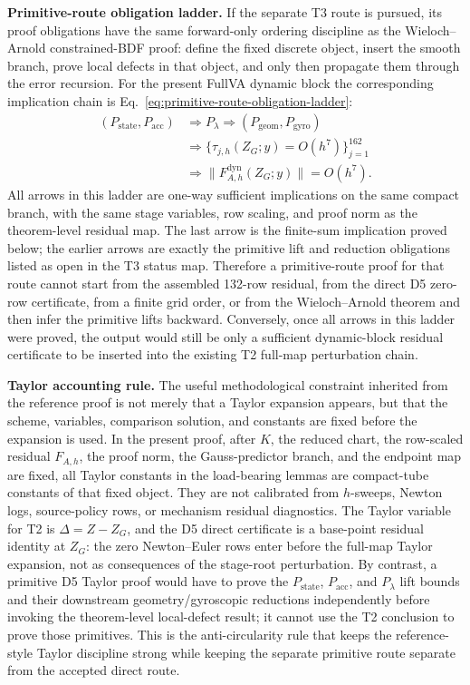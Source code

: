 \documentclass[preprint,12pt]{elsarticle}
\begin{document}
\noindent\textbf{Primitive-route obligation ladder.}
If the separate T3 route is pursued, its proof obligations have the same
forward-only ordering discipline as the Wieloch--Arnold constrained-BDF proof: define
the fixed discrete object, insert the smooth branch, prove local defects in
that object, and only then propagate them through the error recursion.  For the
present FullVA dynamic block the corresponding implication chain is
Eq.~\eqref{eq:primitive-route-obligation-ladder}:
\begin{equation}
\label{eq:primitive-route-obligation-ladder}
\begin{aligned}
  (P_{\mathrm{state}},P_{\mathrm{acc}})
  &\Longrightarrow P_{\lambda}
  \Longrightarrow (P_{\mathrm{geom}},P_{\mathrm{gyro}})\\
  &\Longrightarrow
  \{\tau_{j,h}(Z_G;y)=O(h^7)\}_{j=1}^{162}\\
  &\Longrightarrow
  \|F^{\mathrm{dyn}}_{A,h}(Z_G;y)\|=O(h^7).
\end{aligned}
\end{equation}
All arrows in this ladder are one-way sufficient implications on the same
compact branch, with the same stage variables, row scaling, and proof norm as
the theorem-level residual map.  The last arrow is the finite-sum implication
proved below; the earlier arrows are exactly the primitive lift and reduction
obligations listed as open in the T3 status map.  Therefore a primitive-route
proof for that route cannot start from the assembled 132-row residual, from the direct D5
zero-row certificate, from a finite grid order, or from the Wieloch--Arnold
theorem and then infer the primitive lifts backward.  Conversely, once all
arrows in this ladder were proved, the output would still be only a sufficient
dynamic-block residual certificate to be inserted into the existing T2
full-map perturbation chain.

\noindent\textbf{Taylor accounting rule.}
The useful methodological constraint inherited from the reference proof is
not merely that a Taylor expansion appears, but that the scheme, variables,
comparison solution, and constants are fixed before the expansion is used.
In the present proof, after \(K\), the reduced chart, the row-scaled residual
\(F_{A,h}\), the proof norm, the Gauss-predictor branch, and the endpoint map
are fixed, all Taylor constants in the load-bearing lemmas are compact-tube
constants of that fixed object.  They are not calibrated from \(h\)-sweeps,
Newton logs, source-policy rows, or mechanism residual diagnostics.  The
Taylor variable for T2 is \(\Delta=Z-Z_G\), and the D5 direct certificate is a
base-point residual identity at \(Z_G\): the zero Newton--Euler rows enter
before the full-map Taylor expansion, not as consequences of the stage-root
perturbation.  By contrast, a primitive D5 Taylor proof would have to prove
the \(P_{\mathrm{state}}\), \(P_{\mathrm{acc}}\), and \(P_{\lambda}\) lift
bounds and their downstream geometry/gyroscopic reductions independently
before invoking the theorem-level local-defect result; it cannot use the T2
conclusion to prove those primitives.  This is the anti-circularity rule that
keeps the reference-style Taylor discipline strong while keeping the separate
primitive route separate from the accepted direct route.
\end{document}
